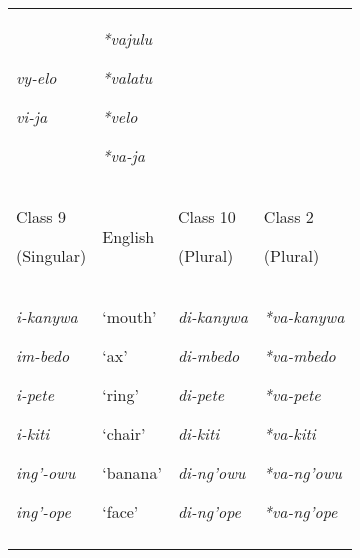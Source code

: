 \documentclass[output=paper]{langsci/langscibook}
\begin{document}
\begin{table}
\begin{tabularx}{\textwidth}{XXXX}
 {\textit{vy-elo}}

 \textit{vi-ja}& \textit{*vajulu}

 {\textit{*valatu}}

 {\textit{*velo}}

 \textit{*va-ja}\\
 Class 9

 (Singular)& English& Class 10

 (Plural)& Class 2

 (Plural)\\
 \textit{i-kanywa}

 {\textit{im-bedo}}

 \textit{i-pete}

 \textit{i-kiti}

 \textit{ing’-owu}

 \textit{ing’-ope}& ‘mouth’

 {‘ax’}

 ‘ring’

 ‘chair’

 ‘banana’

 ‘face’& \textit{di-kanywa}

 {\textit{di-mbedo}}

 \textit{di-pete}

 \textit{di-kiti}

 \textit{di-ng’owu}

 \textit{di-ng’ope}& \textit{*va-kanywa}

 {\textit{*va-mbedo}}

 \textit{*va-pete}

 \textit{*va-kiti}

 \textit{*va-ng’owu}

 \textit{*va-ng’ope}\\
\lspbottomrule
\end{tabularx}


\end{table}
\end{document}
